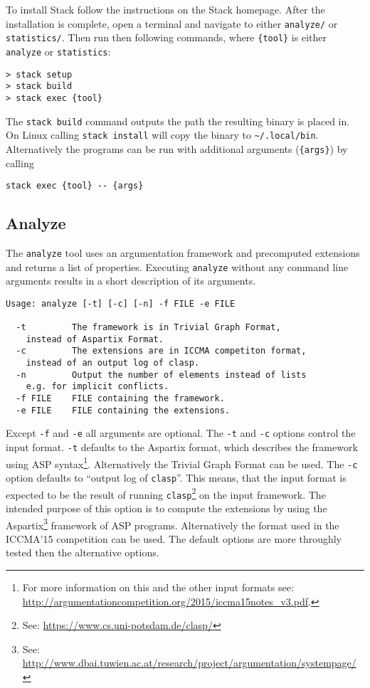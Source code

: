 \documentclass[parskip=half]{scrartcl}
\begin{document}
To install Stack follow the instructions on the Stack homepage.
After the installation is complete, open a terminal and navigate to either
\texttt{analyze/} or \texttt{statistics/}. Then run then following
commands, where \texttt{\{tool\}} is either \texttt{analyze} or
\texttt{statistics}:
\begin{verbatim}
> stack setup
> stack build
> stack exec {tool}
\end{verbatim}

The \texttt{stack build} command outputs the path the resulting binary
is placed in. On Linux calling \texttt{stack install} will copy the binary
to \texttt{\~{}/.local/bin}. Alternatively the programs can be run with
additional arguments (\texttt{\{args\}}) by calling
\begin{verbatim}
stack exec {tool} -- {args}
\end{verbatim}

\subsection{Analyze}

The \texttt{analyze} tool uses an argumentation framework and precomputed
extensions and returns a list of properties. Executing \texttt{analyze}
without any command line arguments results in a short description of
its arguments.

\begin{verbatim}
Usage: analyze [-t] [-c] [-n] -f FILE -e FILE

  -t         The framework is in Trivial Graph Format,
    instead of Aspartix Format.
  -c         The extensions are in ICCMA competiton format,
    instead of an output log of clasp.
  -n         Output the number of elements instead of lists
    e.g. for implicit conflicts.
  -f FILE    FILE containing the framework.
  -e FILE    FILE containing the extensions.
\end{verbatim}

Except \texttt{-f} and \texttt{-e} all arguments are optional.  The \texttt{-t}
and \texttt{-c} options control the input format. \texttt{-t} defaults to the
Aspartix format, which describes the framework using ASP syntax\footnote{For
    more information on this and the other input formats see:
\url{http://argumentationcompetition.org/2015/iccma15notes_v3.pdf}.}.
Alternatively the Trivial Graph Format can be used. The \texttt{-c} option
defaults to ``output log of \texttt{clasp}''. This means, that the input format is
expected to be the result of running \texttt{clasp}\footnote{See:
\url{https://www.cs.uni-potsdam.de/clasp/}} on the input framework. The intended
purpose of this option is to compute the extensions by using the
Aspartix\footnote{See:
\url{http://www.dbai.tuwien.ac.at/research/project/argumentation/systempage/}}
framework of ASP programs. Alternatively the format used in the ICCMA'15
competition can be used. The default options are more throughly tested then the
alternative options.
\end{document}
